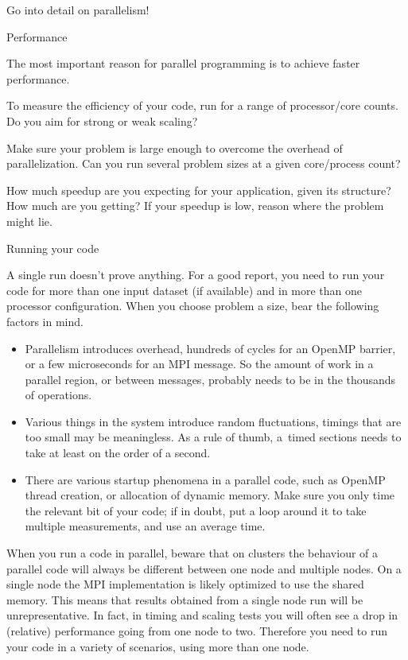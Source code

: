 \begin{tldr}
  Go into detail on parallelism!
\end{tldr}

 {Performance}

The most important reason for parallel programming
is to achieve faster performance.

To measure the efficiency of your code, 
run for a range of processor/core counts.
Do you aim for strong or weak scaling?

Make sure your problem is large enough to overcome
the overhead of parallelization.
Can you run several problem sizes at a given core/process count?

How much speedup are you expecting for your application,
given its structure?
How much are you getting?
If your speedup is low, reason where the problem might lie.

 {Running your code}

A single run doesn't prove anything. For a good report, you need to
run your code for more than one input dataset (if available) and in
more than one processor configuration.
When you choose problem a size,
bear the following factors in mind.
\begin{itemize}
\item Parallelism introduces overhead, hundreds of cycles for an OpenMP barrier,
  or a few microseconds for an MPI message. So the amount of work in a parallel region,
  or between messages, probably needs to be in the thousands of operations.
\item Various things in the system introduce random fluctuations,
  timings that are too small may be meaningless.
  As a rule of thumb, a~timed sections needs to take
  at least on the order of a second.
\item There are various startup phenomena in a parallel code,
  such as OpenMP thread creation, or allocation of dynamic memory.
  Make sure you only time the relevant bit of your code;
  if in doubt, put a loop around it to take multiple measurements,
  and use an average time.
\end{itemize}

When you run a code in parallel, beware that on clusters the behaviour
of a parallel code will always be different between one node and
multiple nodes.  On a single node the MPI implementation is likely
optimized to use the shared memory. This means that results obtained
from a single node run will be unrepresentative. In fact, in timing
and scaling tests you will often see a drop in (relative) performance
going from one node to two.  Therefore you need to run your code in a
variety of scenarios, using more than one node.


